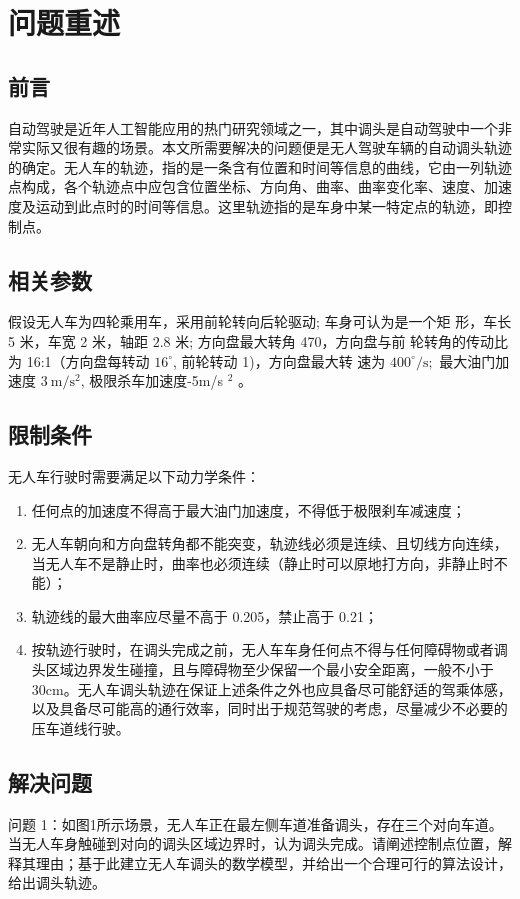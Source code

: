\documentclass{article}
\begin{document}
\section{问题重述}                                          %
\subsection{前言}
自动驾驶是近年人工智能应用的热门研究领域之一，其中调头是自动驾驶中一个非常实际又很有趣的场景。本文所需要解决的问题便是无人驾驶车辆的自动调头轨迹的确定。无人车的轨迹，指的是一条含有位置和时间等信息的曲线，它由一列轨迹点构成，各个轨迹点中应包含位置坐标、方向角、曲率、曲率变化率、速度、加速度及运动到此点时的时间等信息。这里轨迹指的是车身中某一特定点的轨迹，即控制点。

\subsection{相关参数}
假设无人车为四轮乘用车，采用前轮转向后轮驱动; 车身可认为是一个矩
形，车长 5 米，车宽 2 米，轴距 $2.8$ 米; 方向盘最大转角 470，方向盘与前
轮转角的传动比为 16:1（方向盘每转动 $16^{\circ}$, 前轮转动 1)，方向盘最大转
速为 $400^{\circ} / \mathrm{s} ;$ 最大油门加速度 $3 \mathrm{~m} / \mathrm{s}^{2}$, 极限杀车加速度-5m/s $^{2}$ 。

\subsection{限制条件}
\noindent 无人车行驶时需要满足以下动力学条件：
\begin{enumerate}[\indent （1）：]
    \item 任何点的加速度不得高于最大油门加速度，不得低于极限刹车减速度；
    \item 无人车朝向和方向盘转角都不能突变，轨迹线必须是连续、且切线方向连续，当无人车不是静止时，曲率也必须连续（静止时可以原地打方向，非静止时不能）；
    \item 轨迹线的最大曲率应尽量不高于 0.205，禁止高于 0.21；
    \item 按轨迹行驶时，在调头完成之前，无人车车身任何点不得与任何障碍物或者调头区域边界发生碰撞，且与障碍物至少保留一个最小安全距离，一般不小于 30cm。无人车调头轨迹在保证上述条件之外也应具备尽可能舒适的驾乘体感，以及具备尽可能高的通行效率，同时出于规范驾驶的考虑，尽量减少不必要的压车道线行驶。
\end{enumerate}

\subsection{解决问题}
问题 1：如图1所示场景，无人车正在最左侧车道准备调头，存在三个对向车道。当无人车身触碰到对向的调头区域边界时，认为调头完成。请阐述控制点位置，解释其理由；基于此建立无人车调头的数学模型，并给出一个合理可行的算法设计，给出调头轨迹。
\end{document}
